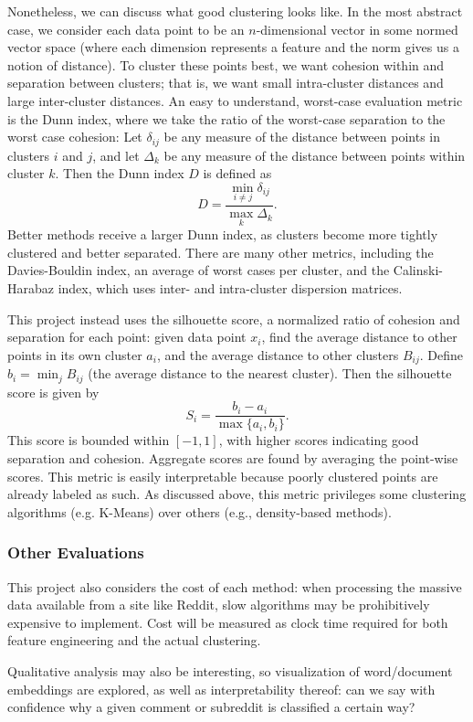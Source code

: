 \documentclass[]{article}
\begin{document}
Nonetheless, we can discuss what good clustering looks like. In the most abstract case, we consider each data point to be an $n$-dimensional vector in some normed vector space (where each dimension represents a feature and the norm gives us a notion of distance). To cluster these points best, we want cohesion within and separation between clusters; that is, we want small intra-cluster distances and large inter-cluster distances. An easy to understand, worst-case evaluation metric is the Dunn index, where we take the ratio of the worst-case separation to the worst case cohesion: Let $\delta_{ij}$ be any measure of the distance between points in clusters $i$ and $j$, and let $\Delta_k$ be any measure of the distance between points within cluster $k$. Then the Dunn index $D$ is defined as
$$ D = \frac{\min_{i\ne j } \delta_{ij}}{\max_{k}\Delta_k}. $$
Better methods receive a larger Dunn index, as clusters become more tightly clustered and better separated. There are many other metrics, including the Davies-Bouldin index, an average of worst cases per cluster, and the Calinski-Harabaz index, which uses inter- and intra-cluster dispersion matrices. 

This project instead uses the silhouette score, a normalized ratio of cohesion and separation for each point: given data point $x_i$, find the average distance to other points in its own cluster $a_i$, and the average distance to other clusters $B_{ij}$. Define $b_i=\min_{j}B_{ij}$ (the average distance to the nearest cluster). Then the silhouette score is given by
$$ S_i = \frac{b_i-a_i}{\max\{a_i,b_i\}}.$$
This score is bounded within $[-1,1]$, with higher scores indicating good separation and cohesion. Aggregate scores are found by averaging the point-wise scores. This metric is easily interpretable because poorly clustered points are already labeled as such. As discussed above, this metric privileges some clustering algorithms (e.g. K-Means) over others (e.g., density-based methods).

\subsubsection{Other Evaluations}
This project also considers the cost of each method: when processing the massive data available from a site like Reddit, slow algorithms may be prohibitively expensive to implement. Cost will be measured as clock time required for both feature engineering and the actual clustering.

Qualitative analysis may also be interesting, so visualization of word/document embeddings are explored, as well as interpretability thereof: can we say with confidence why a given comment or subreddit is classified a certain way?
\end{document}
